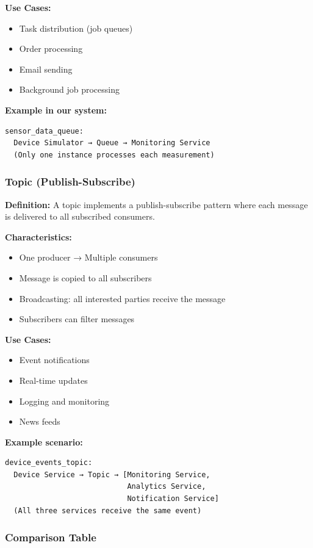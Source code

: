\documentclass[12pt,a4paper]{article}
\begin{document}
\textbf{Use Cases:}
\begin{itemize}
    \item Task distribution (job queues)
    \item Order processing
    \item Email sending
    \item Background job processing
\end{itemize}

\textbf{Example in our system:}
\begin{verbatim}
sensor_data_queue:
  Device Simulator → Queue → Monitoring Service
  (Only one instance processes each measurement)
\end{verbatim}

\subsubsection{Topic (Publish-Subscribe)}

\textbf{Definition:} A topic implements a publish-subscribe pattern where each message is delivered to all subscribed consumers.

\textbf{Characteristics:}
\begin{itemize}
    \item One producer → Multiple consumers
    \item Message is copied to all subscribers
    \item Broadcasting: all interested parties receive the message
    \item Subscribers can filter messages
\end{itemize}

\textbf{Use Cases:}
\begin{itemize}
    \item Event notifications
    \item Real-time updates
    \item Logging and monitoring
    \item News feeds
\end{itemize}

\textbf{Example scenario:}
\begin{verbatim}
device_events_topic:
  Device Service → Topic → [Monitoring Service, 
                            Analytics Service, 
                            Notification Service]
  (All three services receive the same event)
\end{verbatim}

\subsubsection{Comparison Table}
\end{document}
